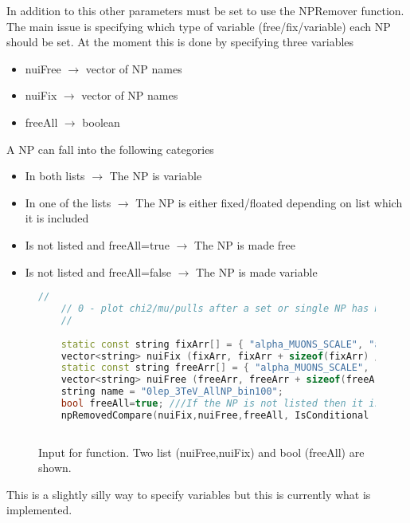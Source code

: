 \documentclass[idxtotoc,hyperref,openany]{labbook} %
\begin{document}
In addition to this other parameters must be set to use the NPRemover function. The main issue is specifying which type of variable (free/fix/variable) each NP should be set. At the moment this is done by specifying three variables 
\begin{itemize}
\item  nuiFree $\rightarrow$ vector of NP names
\item  nuiFix $\rightarrow$ vector of NP names
\item  freeAll $\rightarrow$ boolean 
\end{itemize}

A NP can fall into the following categories
\begin{itemize}
\item  In both lists $\rightarrow$ The NP is variable
\item  In one of the lists $\rightarrow$ The NP is either fixed/floated depending on list which it is included
\item  Is not listed and freeAll=true $\rightarrow$ The NP is made free
\item  Is not listed and freeAll=false $\rightarrow$ The NP is made variable
\end{itemize}

\begin{figure}[H]
 \begin{lstlisting}[language=C++]
    // 
    // 0 - plot chi2/mu/pulls after a set or single NP has been removed.  
    // 
 
    static const string fixArr[] = { "alpha_MUONS_SCALE", "alpha_MODEL_PAR_TTbar_aMcAtNlo", "alpha_Luminosity"  };
    vector<string> nuiFix (fixArr, fixArr + sizeof(fixArr) / sizeof(fixArr[0]) );
    static const string freeArr[] = { "alpha_MUONS_SCALE", "alpha_MODEL_PAR_TTbar_aMcAtNlo", "alpha_Luminosity" };
    vector<string> nuiFree (freeArr, freeArr + sizeof(freeArr) / sizeof(freeArr[0]) );
    string name = "0lep_3TeV_AllNP_bin100";
    bool freeAll=true; ///If the NP is not listed then it is assumed to be free if freeAll=true OR if freeAll=false then all not included are assumed to fix during a fit.
    npRemovedCompare(nuiFix,nuiFree,freeAll, IsConditional , 0.0); 
    
     \end{lstlisting}
 \caption{Input for function. Two list (nuiFree,nuiFix) and bool (freeAll) are shown.}
\end{figure}

This is a slightly silly way to specify variables but this is currently what is implemented.
\end{document}
